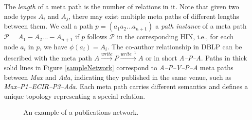 The \textit{length} of a meta path is the number of relations in it. Note that given two node types $A_i$ and $A_j$, there may exist multiple meta paths of different lengths between them. We call a path $p = (a_1a_2...a_{n+1})$ a \textit{path instance} of a meta path $\mathcal{P} = A_1-A_2... -A_{n+1}$ if $p$ follows $\mathcal{P}$ in the corresponding HIN, i.e., for each node $a_i$ in $p$, we have $\phi(a_i)=A_i$. The co-author relationship in DBLP can be described with the meta path $A\xrightarrow{write}P\xrightarrow{write^{-1}}A$ or in short \textit{A--P--A}. Paths in thick solid lines in Figure \ref{sampleNetwork} correspond to \textit{A--P--V--P--A} meta paths between \textit{Max} and \textit{Ada}, indicating they published in the same venue, such as \textit{Max--P1--ECIR--P3--Ada}. Each meta path carries different semantics and defines a unique topology representing a special relation. %

\begin{figure}[t]
\centering
\hspace{0.6cm}
\vspace{-2mm}
\caption{An example of a publications network.}
\end{figure}


